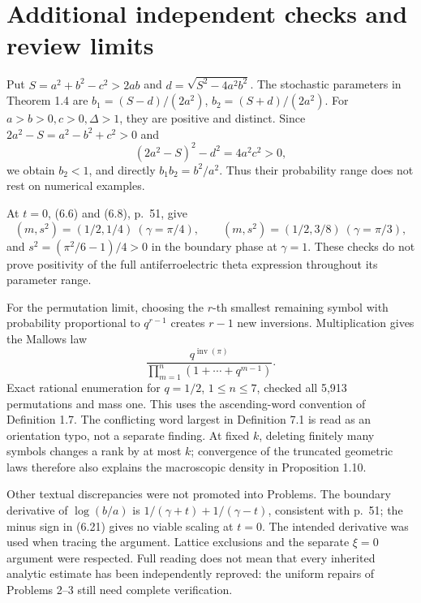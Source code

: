 \documentclass[10pt]{article}
\begin{document}
\section*{Additional independent checks and review limits}
Put \(S=a^2+b^2-c^2>2ab\) and \(d=\sqrt{S^2-4a^2b^2}\). The stochastic parameters in Theorem 1.4 are \(b_1=(S-d)/(2a^2)\), \(b_2=(S+d)/(2a^2)\). For \(a>b>0,c>0,\Delta>1\), they are positive and distinct. Since \(2a^2-S=a^2-b^2+c^2>0\) and \[(2a^2-S)^2-d^2=4a^2c^2>0,\] we obtain \(b_2<1\), and directly \(b_1b_2=b^2/a^2\). Thus their probability range does not rest on numerical examples.\par
At \(t=0\), (6.6) and (6.8), p. 51, give \[(m,s^2)=(1/2,1/4)\ (\gamma=\pi/4),\qquad
 (m,s^2)=(1/2,3/8)\ (\gamma=\pi/3),\] and \(s^2=(\pi^2/6-1)/4>0\) in the boundary phase at \(\gamma=1\). These checks do not prove positivity of the full antiferroelectric theta expression throughout its parameter range.\par
For the permutation limit, choosing the \(r\)-th smallest remaining symbol with probability proportional to \(q^{r-1}\) creates \(r-1\) new inversions. Multiplication gives the Mallows law \[\frac{q^{\operatorname{inv}(\pi)}}{\prod_{m=1}^n(1+\cdots+q^{m-1})}.\] Exact rational enumeration for \(q=1/2\), \(1\le n\le7\), checked all 5,913 permutations and mass one. This uses the ascending-word convention of Definition 1.7. The conflicting word largest in Definition 7.1 is read as an orientation typo, not a separate finding. At fixed \(k\), deleting finitely many symbols changes a rank by at most \(k\); convergence of the truncated geometric laws therefore also explains the macroscopic density in Proposition 1.10.\par
Other textual discrepancies were not promoted into Problems. The boundary derivative of \(\log(b/a)\) is \(1/(\gamma+t)+1/(\gamma-t)\), consistent with p. 51; the minus sign in (6.21) gives no viable scaling at \(t=0\). The intended derivative was used when tracing the argument. Lattice exclusions and the separate \(\xi=0\) argument were respected. Full reading does not mean that every inherited analytic estimate has been independently reproved: the uniform repairs of Problems 2–3 still need complete verification.\par
\end{document}

